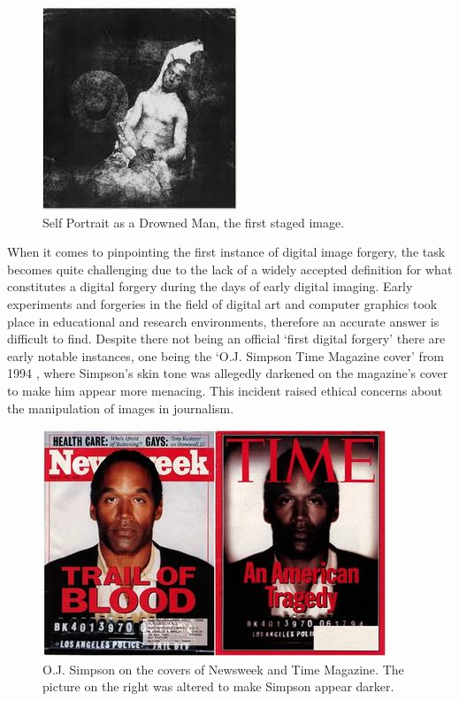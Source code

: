 \begin{figure}[h!]
  \centering
  \includegraphics[width=0.4\linewidth]{figures/drownedman.jpeg}
  \caption{Self Portrait as a Drowned Man, the first staged image. \cite{bayard}}
  \label{fig:drowned}
\end{figure}


When it comes to pinpointing the first instance of digital image forgery, the task becomes quite challenging due to the lack of a widely accepted definition for what constitutes a digital forgery during the days of early digital imaging. Early experiments and forgeries in the field of digital art and computer graphics took place in educational and research environments, therefore an accurate answer is difficult to find. Despite there not being an official `first digital forgery' there are early notable instances, one being the `O.J. Simpson Time Magazine cover' from 1994  \cite{Carmody_1994}, where Simpson's skin tone was allegedly darkened on the magazine's cover to make him appear more menacing. This incident raised ethical concerns about the manipulation of images in journalism.

\begin{figure}[h!]
  \centering
  \includegraphics[width=0.5\linewidth]{figures/oj_simpson.jpg}
  \caption{O.J. Simpson on the covers of Newsweek and Time Magazine. The picture on the right was altered to make Simpson appear darker. \cite{OJ2011}}
  \label{fig:drowned}
\end{figure}

